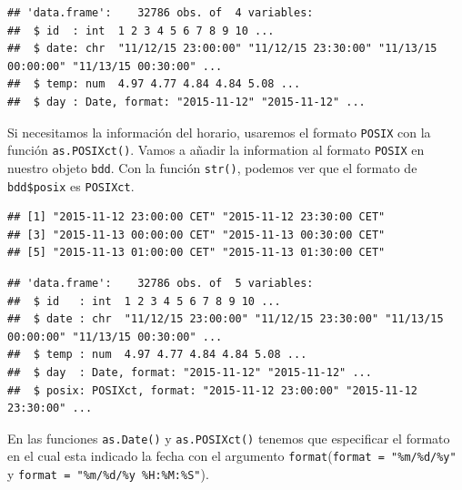 \documentclass[
]{book}
\newenvironment{Shaded}{\begin{snugshade}}{\end{snugshade}}
\newcommand{\DataTypeTok}[1]{\textcolor[rgb]{0.13,0.29,0.53}{#1}}
\newcommand{\KeywordTok}[1]{\textcolor[rgb]{0.13,0.29,0.53}{\textbf{#1}}}
\newcommand{\NormalTok}[1]{#1}
\newcommand{\OperatorTok}[1]{\textcolor[rgb]{0.81,0.36,0.00}{\textbf{#1}}}
\newcommand{\StringTok}[1]{\textcolor[rgb]{0.31,0.60,0.02}{#1}}
\begin{document}
\begin{verbatim}
## 'data.frame':    32786 obs. of  4 variables:
##  $ id  : int  1 2 3 4 5 6 7 8 9 10 ...
##  $ date: chr  "11/12/15 23:00:00" "11/12/15 23:30:00" "11/13/15 00:00:00" "11/13/15 00:30:00" ...
##  $ temp: num  4.97 4.77 4.84 4.84 5.08 ...
##  $ day : Date, format: "2015-11-12" "2015-11-12" ...
\end{verbatim}

Si necesitamos la información del horario, usaremos el formato \texttt{POSIX} con la función \texttt{as.POSIXct()}. Vamos a añadir la information al formato \texttt{POSIX} en nuestro objeto \texttt{bdd}. Con la función \texttt{str()}, podemos ver que el formato de \texttt{bdd\$posix} es \texttt{POSIXct}.

\begin{Shaded}
\end{Shaded}

\begin{verbatim}
## [1] "2015-11-12 23:00:00 CET" "2015-11-12 23:30:00 CET"
## [3] "2015-11-13 00:00:00 CET" "2015-11-13 00:30:00 CET"
## [5] "2015-11-13 01:00:00 CET" "2015-11-13 01:30:00 CET"
\end{verbatim}

\begin{Shaded}
\end{Shaded}

\begin{verbatim}
## 'data.frame':    32786 obs. of  5 variables:
##  $ id   : int  1 2 3 4 5 6 7 8 9 10 ...
##  $ date : chr  "11/12/15 23:00:00" "11/12/15 23:30:00" "11/13/15 00:00:00" "11/13/15 00:30:00" ...
##  $ temp : num  4.97 4.77 4.84 4.84 5.08 ...
##  $ day  : Date, format: "2015-11-12" "2015-11-12" ...
##  $ posix: POSIXct, format: "2015-11-12 23:00:00" "2015-11-12 23:30:00" ...
\end{verbatim}

En las funciones \texttt{as.Date()} y \texttt{as.POSIXct()} tenemos que especificar el formato en el cual esta indicado la fecha con el argumento \texttt{format}(\texttt{format\ =\ "\%m/\%d/\%y"} y \texttt{format\ =\ "\%m/\%d/\%y\ \%H:\%M:\%S"}).
\end{document}
